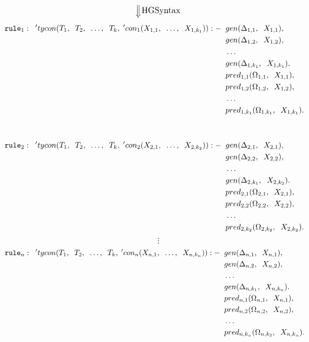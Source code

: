 	$$\SLongdownarrow \text{HGSyntax}$$
	\begin{align*}
		\texttt{rule}_1: \;\; 'tycon (T_1, \;\; T_2, \;\; \ldots, \;\; T_k, \; 'con_1(X_{1,1}, \;\; \ldots, \;\; X_{1,k_1})) :-&
		\;\; gen(\Delta_{1,1}, \;\; X_{1,1}), && \\
		  & \;\; gen(\Delta_{1,2}, \;\; X_{1,2}),       &   &   \\
		  & \;\; \ldots \;\;                                    &   &   \\
		  & \;\; gen(\Delta_{1,k_1}, \;\; X_{1,k_1}). &   &   \\
		  & \;\; pred_{1, 1}(\Omega_{1,1}, \;\; X_{1,1}), && \\
		  & \;\; pred_{1, 2}(\Omega_{1,2}, \;\; X_{1,2}),       &   &   \\
		  & \;\; \ldots \;\;                                    &   &   \\
		  & \;\; pred_{1, k_1}(\Omega_{1,k_1}, \;\; X_{1,k_1}). &   &   \\
		\\
		\\
		\texttt{rule}_2: \;\; 'tycon (T_1, \;\; T_2, \;\; \ldots, \;\; T_k, \; 'con_2(X_{2,1}, \;\; \ldots, \;\; X_{2,k_2})) :-&
		\;\; gen(\Delta_{2,1}, \;\; X_{2,1}), && \\
		  & \;\; gen(\Delta_{2,2}, \;\; X_{2,2}),       &   &   \\
		  & \;\; \ldots \;\;                                    &   &   \\
		  & \;\; gen(\Delta_{2,k_1}, \;\; X_{2,k_2}). &   &   \\
		  & \;\; pred_{2, 1}(\Omega_{2,1}, \;\; X_{2,1}), && \\
		  & \;\; pred_{2, 2}(\Omega_{2,2}, \;\; X_{2,2}),       &   &   \\
		  & \;\; \ldots \;\;                                    &   &   \\
		  & \;\; pred_{2, k_2}(\Omega_{2,k_2}, \;\; X_{2,k_2}). &   &   \\
	\end{align*}
	$$\vdots$$
	\begin{align*}
		\texttt{rule}_n: \;\; 'tycon (T_1, \;\; T_2, \;\; \ldots, \;\; T_k, \; 'con_n(X_{n,1}, \;\; \ldots, \;\; X_{n,k_n})) :-&
		\;\; gen(\Delta_{n,1}, \;\; X_{n,1}), && \\
		  & \;\; gen(\Delta_{n,2}, \;\; X_{n,2}),       &   &   \\
		  & \;\; \ldots \;\;                                    &   &   \\
		  & \;\; gen(\Delta_{n,k_1}, \;\; X_{n,k_n}). &   &   \\
		  & \;\; pred_{n, 1}(\Omega_{n,1}, \;\; X_{n,1}), && \\
		  & \;\; pred_{n, 2}(\Omega_{n,2}, \;\; X_{n,2}),       &   &   \\
		  & \;\; \ldots \;\;                                    &   &   \\
		  & \;\; pred_{n, k_n}(\Omega_{n,k_2}, \;\; X_{n,k_n}). &   &   \\
	\end{align*}\\
